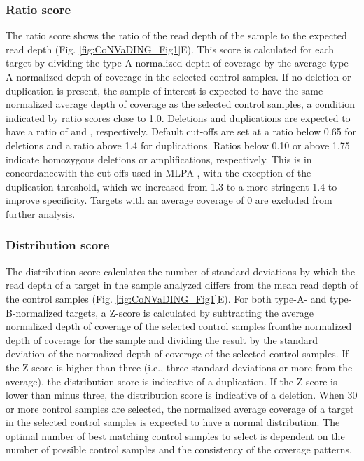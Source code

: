 \subsubsection{Ratio score}
The ratio score shows the ratio of the read depth of the sample to the expected read depth (Fig. \ref{fig:CoNVaDING_Fig1}E). 
This score is calculated for each target by dividing the type A normalized depth of coverage by the average type A normalized depth of coverage in the selected control samples. 
If no deletion or duplication is present, the sample of interest is expected to have the same normalized average depth of coverage as the selected control samples, a condition indicated by ratio scores close to 1.0. 
Deletions and duplications are expected to have a ratio of  and , respectively. Default cut-offs are set at a ratio below 0.65 for deletions and a ratio above 1.4 for duplications. 
Ratios below 0.10 or above 1.75 indicate homozygous deletions or amplifications, respectively. This is in concordancewith the cut-offs used in MLPA \cite{MRC_Holland_2014}, with the exception of the duplication threshold, which we increased from 1.3 to a more stringent 1.4 to improve specificity. Targets with an average coverage of 0 are excluded from further analysis.


\subsubsection{Distribution score}
The distribution score calculates the number of standard deviations by which the read depth of a target in the sample analyzed differs from the mean read depth of the control samples (Fig. \ref{fig:CoNVaDING_Fig1}E). 
For both type-A- and type-B-normalized targets, a Z-score is calculated by subtracting the average normalized depth of coverage of the selected control samples fromthe normalized depth of coverage for the sample and dividing the result by the standard deviation of the normalized depth of coverage of the selected control samples. 
If the Z-score is higher than three (i.e., three standard deviations or more from the average), the distribution score is indicative of a duplication. 
If the Z-score is lower than minus three, the distribution score is indicative of a deletion. 
When 30 or more control samples are selected, the normalized average coverage of a target in the selected control samples is expected to have a normal distribution. The optimal number of best matching control samples to select is dependent on the number of possible control samples and the consistency of the coverage patterns.

